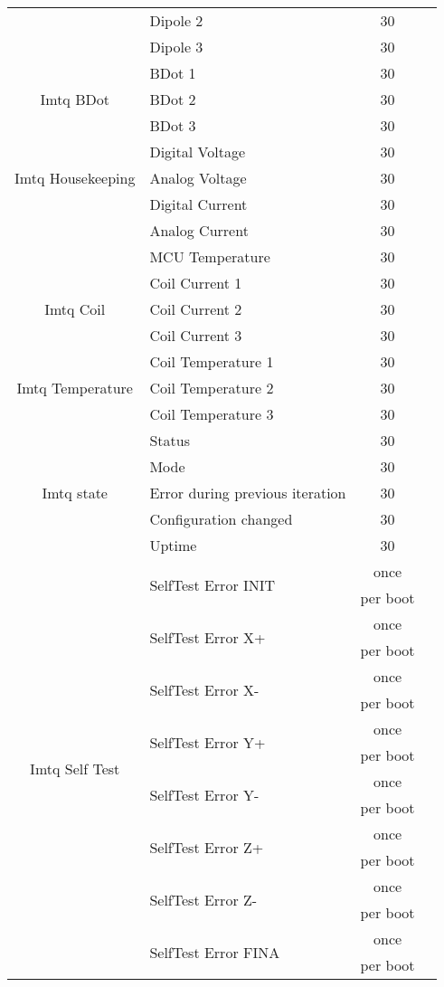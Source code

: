 \begin{longtable}{c|l|c|l}
    & Dipole 2 & 30 \\
    & Dipole 3 & 30 \\
    \hline
    \multirow{3}{*}{Imtq BDot} & BDot 1 & 30 \\
    & BDot 2 & 30 \\
    & BDot 3 & 30 \\
    \hline
    \multirow{3}{*}{Imtq Housekeeping} & Digital Voltage & 30 \\
    & Analog Voltage & 30 \\
    & Digital Current & 30 \\
    & Analog Current & 30 \\
    & MCU Temperature & 30 \\
    \hline
    \multirow{3}{*}{Imtq Coil} & Coil Current 1 & 30 \\
    & Coil Current 2 & 30 \\
    & Coil Current 3 & 30 \\
    \hline
    \multirow{3}{*}{Imtq Temperature} & Coil Temperature 1 & 30 \\
    & Coil Temperature 2 & 30 \\
    & Coil Temperature 3 & 30 \\
    \hline
    \multirow{5}{*}{Imtq state} & Status & 30 \\
    & Mode & 30 \\
    & Error during previous iteration & 30 \\
    & Configuration changed & 30 \\
    & Uptime & 30 \\
    \hline
    \multirow{16}{*}{Imtq Self Test} & \multirow{2}{*}{SelfTest Error INIT} & once \\
    & & per boot \\
    & \multirow{2}{*}{SelfTest Error X+} & once \\
    & & per boot \\
    & \multirow{2}{*}{SelfTest Error X-} & once \\
    & & per boot \\
    & \multirow{2}{*}{SelfTest Error Y+} & once \\
    & & per boot \\
    & \multirow{2}{*}{SelfTest Error Y-} & once \\
    & & per boot \\
    & \multirow{2}{*}{SelfTest Error Z+} & once \\
    & & per boot \\
    & \multirow{2}{*}{SelfTest Error Z-} & once \\
    & & per boot \\
    & \multirow{2}{*}{SelfTest Error FINA} & once \\
    & & per boot \\
    \bottomrule
\end{longtable}
